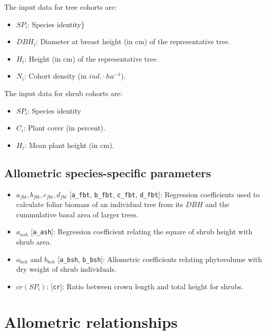 \documentclass[]{book}
\providecommand{\tightlist}{%
  \setlength{\itemsep}{0pt}\setlength{\parskip}{0pt}}
\begin{document}
The input data for tree cohorts are:

\begin{itemize}
\tightlist
\item
  \(SP_i\): Species identity\}
\item
  \(DBH_i\): Diameter at breast height (in cm) of the representative
  tree.
\item
  \(H_i\): Height (in cm) of the representative tree.
\item
  \(N_i\): Cohort density (in \(ind.\cdot ha^{-1}\)).
\end{itemize}

The input data for shrub cohorts are:

\begin{itemize}
\tightlist
\item
  \(SP_i\): Species identity
\item
  \(C_i\): Plant cover (in percent).
\item
  \(H_i\): Mean plant height (in cm).
\end{itemize}

\subsection{Allometric species-specific
parameters}\label{allometric-species-specific-parameters}

\begin{itemize}
\tightlist
\item
  \(a_{fbt}, b_{fbt}, c_{fbt}, d_{fbt}\) {[}\texttt{a\_fbt},
  \texttt{b\_fbt}, \texttt{c\_fbt}, \texttt{d\_fbt}{]}: Regression
  coefficients used to calculate foliar biomass of an individual tree
  from its \(DBH\) and the cummulative basal area of larger trees.
\item
  \(a_{ash}\) {[}\texttt{a\_ash}{]}: Regression coefficient relating the
  square of shrub height with shrub area.
\item
  \(a_{bsh}\) and \(b_{bsh}\) {[}\texttt{a\_bsh}, \texttt{b\_bsh}{]}:
  Allometric coefficients relating phytovolume with dry weight of shrub
  individuals.
\item
  \(cr(SP_i)\): {[}\texttt{cr}{]}: Ratio between crown length and total
  height for shrubs.
\end{itemize}

\section{Allometric relationships}\label{allometric-relationships}
\end{document}
